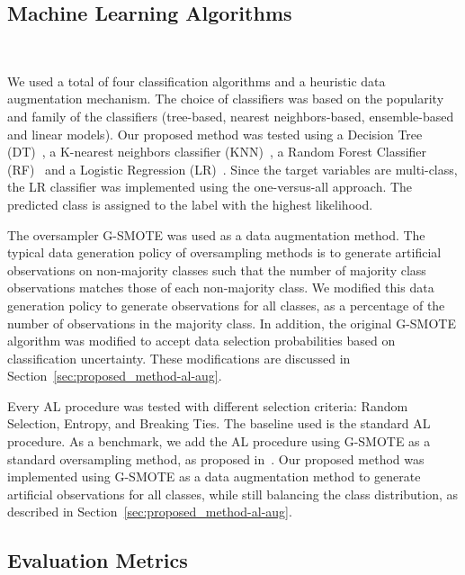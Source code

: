 \subsection{Machine Learning Algorithms}~\label{sec:machine_learning_algorithms-al-aug}

We used a total of four classification algorithms and a heuristic data
augmentation mechanism. The choice of classifiers was based on the popularity
and family of the classifiers (tree-based, nearest neighbors-based,
ensemble-based and linear models). Our proposed method was tested using a
Decision Tree (DT)~\cite{Wu1975}, a K-nearest neighbors classifier
(KNN)~\cite{Cover1967}, a Random Forest Classifier (RF)~\cite{Ho1995} and a
Logistic Regression (LR)~\cite{Nelder1972}. Since the target variables are
multi-class, the LR classifier was implemented using the one-versus-all
approach. The predicted class is assigned to the label with the highest
likelihood.
 
The oversampler G-SMOTE was used as a data augmentation method. The typical
data generation policy of oversampling methods is to generate artificial
observations on non-majority classes such that the number of majority class
observations matches those of each non-majority class. We modified this data
generation policy to generate observations for all classes, as a percentage of
the number of observations in the majority class. In addition, the original
G-SMOTE algorithm was modified to accept data selection probabilities based on
classification uncertainty. These modifications are discussed in
Section~\ref{sec:proposed_method-al-aug}.

Every AL procedure was tested with different selection criteria: Random
Selection, Entropy, and Breaking Ties. The baseline used is the standard AL
procedure. As a benchmark, we add the AL procedure using G-SMOTE as a standard
oversampling method, as proposed in~\cite{Fonseca2021al}. Our proposed method
was implemented using G-SMOTE as a data augmentation method to generate
artificial observations for all classes, while still balancing the class
distribution, as described in Section~\ref{sec:proposed_method-al-aug}. 
 
\subsection{Evaluation Metrics}~\label{sec:evaluation_metrics-al-aug}


